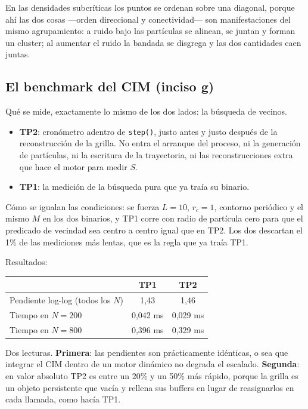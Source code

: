 \documentclass[11pt]{article}
\begin{document}
En las densidades subcríticas los puntos se ordenan sobre una diagonal, porque
ahí las dos cosas ---orden direccional y conectividad--- son manifestaciones del
mismo agrupamiento: a ruido bajo las partículas se alinean, se juntan y forman
un cluster; al aumentar el ruido la bandada se disgrega y las dos cantidades
caen juntas.

\subsection{El benchmark del CIM (inciso g)}

Qué se mide, exactamente lo mismo de los dos lados: la búsqueda de vecinos.

\begin{itemize}
  \item \textbf{TP2}: cronómetro adentro de \texttt{step()}, justo antes y justo
    después de la reconstrucción de la grilla. No entra el arranque del proceso,
    ni la generación de partículas, ni la escritura de la trayectoria, ni las
    reconstrucciones extra que hace el motor para medir $S$.
  \item \textbf{TP1}: la medición de la búsqueda pura que ya traía su binario.
\end{itemize}

Cómo se igualan las condiciones: se fuerza $L = 10$, $r_c = 1$, contorno
periódico y el mismo $M$ en los dos binarios, y TP1 corre con radio de partícula
cero para que el predicado de vecindad sea centro a centro igual que en TP2. Los
dos descartan el 1\% de las mediciones más lentas, que es la regla que ya traía
TP1.

Resultados:

\begin{center}
\begin{tabular}{lcc}
\toprule
 & TP1 & TP2 \\
\midrule
Pendiente log-log (todos los $N$) & 1{,}43 & 1{,}46 \\
Tiempo en $N = 200$ & 0{,}042 ms & 0{,}029 ms \\
Tiempo en $N = 800$ & 0{,}396 ms & 0{,}329 ms \\
\bottomrule
\end{tabular}
\end{center}

Dos lecturas. \textbf{Primera}: las pendientes son prácticamente idénticas, o
sea que integrar el CIM dentro de un motor dinámico no degrada el escalado.
\textbf{Segunda}: en valor absoluto TP2 es entre un 20\% y un 50\% más rápido,
porque la grilla es un objeto persistente que vacía y rellena sus buffers en
lugar de reasignarlos en cada llamada, como hacía TP1.
\end{document}
